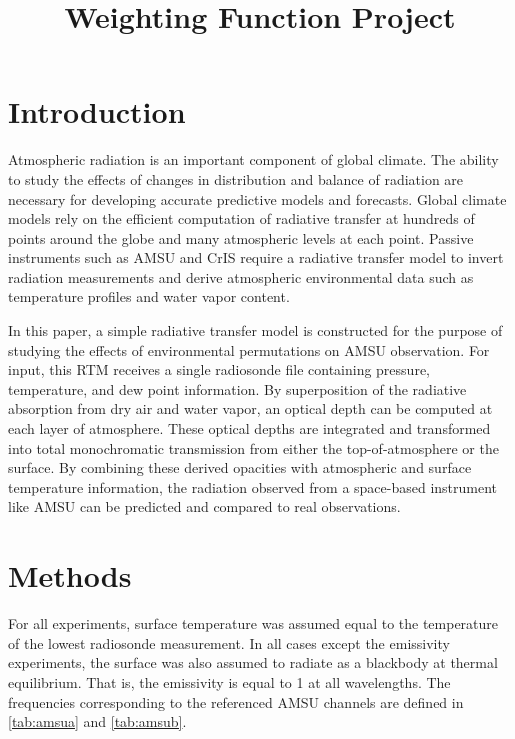 \documentclass[twocol]{ametsoc}
\title{Weighting Function Project}
\affiliation{University of Wisconsin - Madison}
\begin{document}
\maketitle


%
\section{Introduction}

Atmospheric radiation is an important component of global climate.
The ability to study the effects of changes in distribution and balance of radiation are necessary for developing accurate predictive models and forecasts.
Global climate models rely on the efficient computation of radiative transfer at hundreds of points around the globe and many atmospheric levels at each point.
Passive instruments such as AMSU and CrIS require a radiative transfer model to invert radiation measurements and derive atmospheric environmental data such as temperature profiles and water vapor content.
\par In this paper, a simple radiative transfer model is constructed for the purpose of studying the effects of environmental permutations on AMSU observation.
For input, this RTM receives a  single radiosonde file containing pressure, temperature, and dew point information.
By superposition of the radiative absorption from dry air and water vapor, an optical depth can be computed at each layer of atmosphere.
These optical depths are integrated and transformed into total monochromatic transmission from either the top-of-atmosphere or the surface.
By combining these derived opacities with atmospheric and surface temperature information, the radiation observed from a space-based instrument like AMSU can be predicted and compared to real observations.

\section{Methods}

For all experiments, surface temperature was assumed equal to the temperature of the lowest radiosonde measurement.
In all cases except the emissivity experiments, the surface was also assumed to radiate as a blackbody at thermal equilibrium. That is, the emissivity is equal to 1 at all wavelengths.
The frequencies corresponding to the referenced AMSU channels are defined in \autoref{tab:amsua} and \autoref{tab:amsub}.
\end{document}
